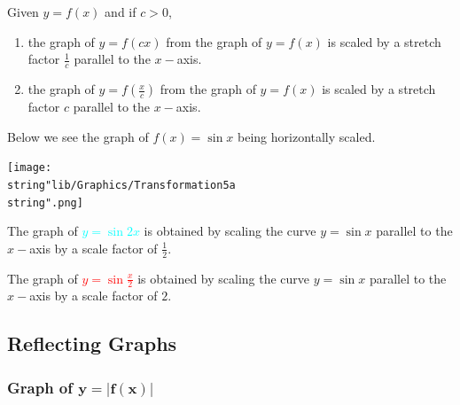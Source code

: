 \documentclass[11pt,a4paper]{book}
\begin{document}
\begin{tcolorbox}[colback=blue!5, colframe=black,boxrule=.4pt, sharpish corners]

Given $y=f\left(x\right)$ and if $c>0$,

\begin{enumerate}[label=(\alph*)]

\item  the graph of $y=f\left(cx\right)$ from the graph of $y=f\left(x\right)$
is scaled by a stretch factor ${\displaystyle \frac{1}{c}}$ parallel
to the $x-$axis.

\item  the graph of ${\displaystyle y=f\left(\frac{x}{c}\right)}$
from the graph of $y=f\left(x\right)$ is scaled by a stretch factor
$c$ parallel to the $x-$axis.

\end{enumerate}
\end{tcolorbox}

\medskip

Below we see the graph of $f\left(x\right)=\sin x$ being horizontally
scaled.

\bigskip

\begin{minipage}[t]{0.5\textwidth}
\begin{center}
\texttt{[image: \\string"lib/Graphics/Transformation5a\\string".png]}
\par\end{center}

\end{minipage}
\begin{minipage}[t]{0.5\textwidth}

The graph of \textcolor{cyan}{$y=\sin2x$} is obtained by scaling
the curve $y=\sin x$ parallel to the $x-$axis by a scale factor
of ${\displaystyle \frac{1}{2}}$.

The graph of \textcolor{red}{${\displaystyle y=\sin\frac{x}{2}}$}
is obtained by scaling the curve $y=\sin x$ parallel to the $x-$axis
by a scale factor of $2$.

\end{minipage}
\newpage


\subsection{Reflecting Graphs}

\subsubsection{Graph of $\boldsymbol{y=\left|f\left(x\right)\right|}$}
\end{document}
